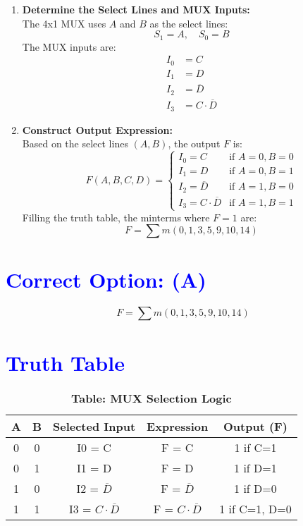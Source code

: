 \documentclass[twocolumn]{article}
\begin{document}
\begin{enumerate}[label=\textbf{Step \arabic*:}]
    \item \textbf{Determine the Select Lines and MUX Inputs:} \\
    The 4x1 MUX uses $A$ and $B$ as the select lines:
    \[
    S_1 = A, \quad S_0 = B
    \]
    The MUX inputs are:
    \begin{align*}
        I_0 &= C \\
        I_1 &= D \\
        I_2 &= \overline{D} \\
        I_3 &= C \cdot \overline{D}
    \end{align*}

    \item \textbf{Construct Output Expression:} \\
    Based on the select lines $(A,B)$, the output $F$ is:
    \[
    F(A,B,C,D) = 
    \begin{cases}
    I_0 = C & \text{if } A=0, B=0 \\
    I_1 = D & \text{if } A=0, B=1 \\
    I_2 = \overline{D} & \text{if } A=1, B=0 \\
    I_3 = C \cdot \overline{D} & \text{if } A=1, B=1
    \end{cases}
    \]
    Filling the truth table, the minterms where $F=1$ are: \\
    \[
    F = \sum m(0, 1, 3, 5, 9, 10, 14)
    \]
\end{enumerate}

\section*{\textcolor{blue}{Correct Option: (A)}}
\[
F = \sum m(0,1,3,5,9,10,14)
\]

\section*{\textcolor{blue}{Truth Table}}
\begin{table}[h]
\centering
\renewcommand{\arraystretch}{1.3}
\begin{tabular}{|c|c|c|c|c|}
\hline
A & B & Selected Input & Expression & Output (F) \\
\hline
0 & 0 & I0 = C & F = C & 1 if C=1 \\
0 & 1 & I1 = D & F = D & 1 if D=1 \\
1 & 0 & I2 = $\overline{D}$ & F = $\overline{D}$ & 1 if D=0 \\
1 & 1 & I3 = $C\cdot\overline{D}$ & F = $C\cdot\overline{D}$ & 1 if C=1, D=0 \\
\hline
\end{tabular}
\caption*{\textbf{Table: MUX Selection Logic}}
\end{table}
\end{document}
